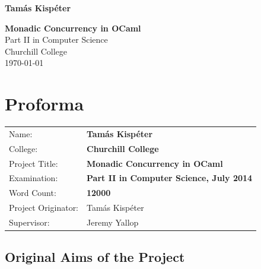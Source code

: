 \documentclass[12pt,twoside,notitlepage]{report}
\theoremstyle{plain}%
\theoremstyle{definition}
\theoremstyle{remark}
\begin{document}





\pagestyle{empty}

\hfill{\LARGE \bf Tam\'as Kisp\'eter}

\vspace*{60mm}
\begin{center}
\Huge
{\bf Monadic Concurrency in OCaml} \\
\vspace*{5mm}
Part II in Computer Science \\
\vspace*{5mm}
Churchill College \\
\vspace*{5mm}
\today  %
\end{center}

\cleardoublepage


\setcounter{page}{1}
\pagestyle{plain}

\chapter*{Proforma}

{\large
\begin{tabular}{ll}
Name:               & \bf Tam\'as Kisp\'eter                     \\
College:            & \bf Churchill College                     \\
Project Title:      & \bf Monadic Concurrency in OCaml \\
Examination:        & \bf Part II in Computer Science, July 2014        \\
Word Count:         & \bf 12000\footnotemark[1]            \\
Project Originator: & Tam\'as Kisp\'eter                    \\
Supervisor:         & Jeremy Yallop                    \\ 
\end{tabular}
}


\section*{Original Aims of the Project}
\end{document}
